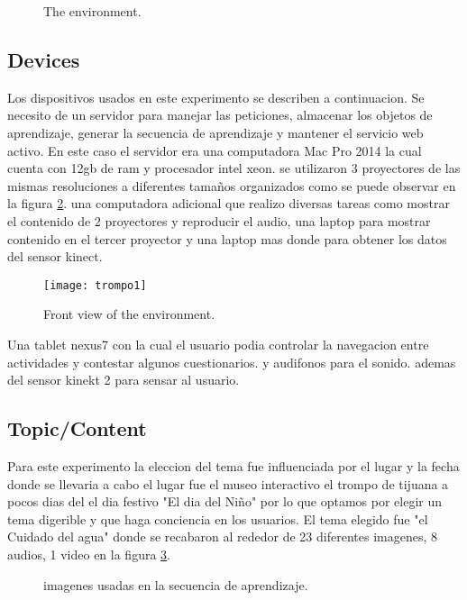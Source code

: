 \begin{figure}[htbp]
\centering
{}\hspace{10mm}
\caption{The environment.} \label{fig:environment}
\end{figure}

\subsection{Devices}
Los dispositivos usados en este experimento se describen a continuacion. Se necesito de un servidor para manejar las peticiones, almacenar los objetos de aprendizaje, generar la secuencia de aprendizaje y mantener el servicio web activo. En este caso el servidor era una computadora Mac Pro 2014 la cual cuenta con 12gb de ram y procesador intel xeon. se utilizaron 3 proyectores de las mismas resoluciones a diferentes tamaños organizados como se puede observar en la figura \ref{trompo1}. una computadora adicional que realizo diversas tareas como mostrar el contenido de 2 proyectores y reproducir el audio,  una laptop para mostrar contenido en el tercer proyector y una laptop mas donde para obtener los datos del sensor kinect. 

\begin{figure}[ht!]  
\centering  
\texttt{[image: trompo1]}
\caption{Front view of the environment.}  
\label{trompo1}  
\end{figure}
Una tablet nexus7 con la cual el usuario podia controlar la navegacion entre actividades y contestar algunos cuestionarios. y audifonos para el sonido. ademas del sensor kinekt 2 para sensar al usuario.


\subsection{Topic/Content}
Para este experimento la eleccion del tema fue influenciada por el lugar y la fecha donde se llevaria a cabo el lugar fue el museo interactivo el trompo de tijuana a pocos dias del el dia festivo "El dia del Niño" por lo que optamos por elegir un tema digerible y que haga conciencia en los usuarios. El tema elegido fue "el Cuidado del agua" donde se recabaron al rededor de 23 diferentes imagenes, 8 audios, 1 video en la figura \ref{fig:agua}. 
\begin{figure}[htbp]
\centering
{}\hspace{10mm}
\vspace{10mm}
\caption{imagenes usadas en la secuencia de aprendizaje.} \label{fig:agua}
\end{figure}

